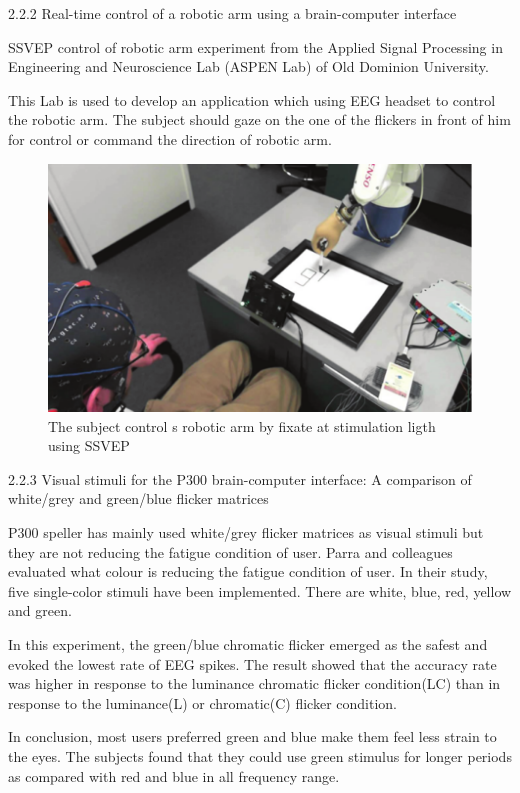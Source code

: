 2.2.2 Real-time control of a robotic arm using a brain-computer interface\cite{asy}

SSVEP control of robotic arm experiment from the Applied Signal Processing in Engineering and Neuroscience Lab (ASPEN Lab) of Old Dominion University.\par
This Lab is used to develop an application which using EEG headset to control the robotic arm. The subject should gaze on the one of the flickers in front of him for control or command the direction of robotic arm.\\
\begin{figure}[h]
	\centering
  	\includegraphics[scale = 0.70]{chapter2/22.pdf}
  	\caption{The subject control s robotic arm by fixate at stimulation ligth using SSVEP}
\end{figure}
\newpage

2.2.3	Visual stimuli for the P300 brain-computer interface: A comparison of white/grey and green/blue flicker matrices\cite{vis}

P300 speller has mainly used white/grey flicker matrices as visual stimuli but they are not reducing the fatigue condition of user. Parra and colleagues evaluated what colour is reducing the fatigue condition of user. In their study, five single-color stimuli have been implemented. There are white, blue, red, yellow and green.\par
In this experiment, the green/blue chromatic flicker emerged as the safest and evoked the lowest rate of EEG spikes. The result showed that the accuracy rate was higher in response to the luminance chromatic flicker condition(LC) than in response to the luminance(L) or chromatic(C) flicker condition.

In conclusion, most users preferred green and blue make them feel less strain to the eyes. The subjects found that they could use green stimulus for longer periods as compared with red and blue in all frequency range.

